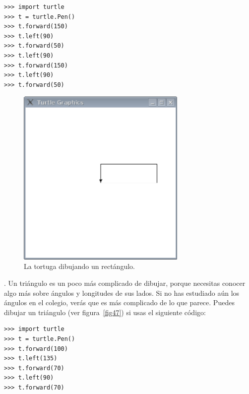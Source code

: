 \begin{listing}
\begin{verbatim}
>>> import turtle
>>> t = turtle.Pen()
>>> t.forward(150)
>>> t.left(90)
>>> t.forward(50)
>>> t.left(90)
>>> t.forward(150)
>>> t.left(90)
>>> t.forward(50)
\end{verbatim}
\end{listing}

\begin{figure}
\begin{center}
\includegraphics[width=82mm]{figure46.eps}
\end{center}
\caption{La tortuga dibujando un rectángulo.}\label{fig46}
\end{figure}

.   Un triángulo es un poco más complicado de dibujar, porque necesitas conocer algo más sobre ángulos y longitudes de sus lados.   Si no has estudiado aún los ángulos en el colegio, verás que es más complicado de lo que parece.   Puedes dibujar un triángulo (ver figura~\ref{fig47}) si usas el siguiente código:

\begin{listing}
\begin{verbatim}
>>> import turtle
>>> t = turtle.Pen()
>>> t.forward(100)
>>> t.left(135)
>>> t.forward(70)
>>> t.left(90)
>>> t.forward(70)
\end{verbatim}
\end{listing}


